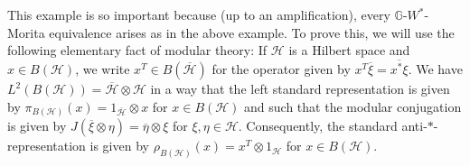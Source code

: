 \documentclass[reqno]{amsart}
\numberwithin{equation}{section}
\newcommand{\G}{\mathbb{G}}
\newcommand{\ovot}{\bar{\otimes}}
\begin{document}
    
 
This example is so important because (up to an amplification), every $\G$-$W^*$-Morita equivalence arises as in the above example. To prove this, we will use the following elementary fact of modular theory: If $\mathcal{H}$ is a Hilbert space and $x\in B(\mathcal{H})$, we write $x^T\in B(\overline{\mathcal{H}})$ for the operator given by $x^T \overline{\xi}= \overline{x^*\xi}.$ We have $L^2(B(\mathcal{H}))= \overline{\mathcal{H}}\otimes \mathcal{H}$ in a way that the left standard representation is given by
$\pi_{B(\mathcal{H})}(x)= 1_{\overline{\mathcal{H}}}\otimes x$ for $x\in B(\mathcal{H})$ and such that the modular conjugation is given by $J(\overline{\xi}\otimes \eta)= \overline{\eta}\otimes \xi$ for $\xi, \eta \in \mathcal{H}$. Consequently, the standard anti-$*$-representation is given by $\rho_{B(\mathcal{H})}(x) = x^T \otimes 1_{\mathcal{H}}$ for $x\in B(\mathcal{H})$.
\end{document}
